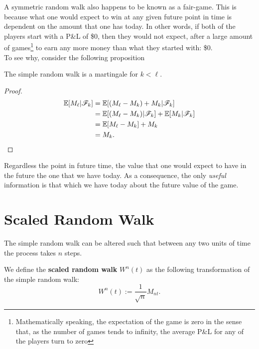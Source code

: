 \documentclass[../TGMAFFIRO]{subfiles}
\begin{document}
A symmetric random walk also happens to be known as a fair-game. This is because what one would expect to win at any given future point in time is dependent on the amount that one has today. In other words, if both of the players start with a P\&L of \$0, then they would not expect, after a large amount of games\footnote{Mathematically speaking, the expectation of the game is zero in the sense that, as the number of games tends to infinity, the average P\&L for any of the players turn to zero} to earn any more money than what they started with: \$0.\\

To see why, consider the following proposition

\begin{proposition}
	The simple random walk is a martingale for $k < \ell$.
\end{proposition}

\begin{proof}
	\begin{align*}
				\mathbb{E}[M_\ell|\mathscr{F}_k] &= \mathbb{E}[(M_\ell - M_k) + M_k | \mathscr{F}_k] \\
				&= \mathbb{E}[(M_\ell - M_k) | \mathscr{F}_k] + \mathbb{E}[M_k | \mathscr{F}_k] \\
				&= \mathbb{E}[M_\ell - M_k] + M_k\\
				&= M_k.
	\end{align*}
\end{proof}

Regardless the point in future time, the value that one would expect to have in the future the one that we have today. As a consequence, the only \textit{useful} information is that which we have today about the future value of the game.

\section{Scaled Random Walk}
The simple random walk can be altered such that between any two units of time the process takes $n$ steps.

\begin{definition}
	We define the \textbf{scaled random walk} $W^n(t)$ as the following transformation of the simple random walk:
	\[W^n(t) := \frac{1}{\sqrt{n}}M_{nt}.\]
\end{definition}
\end{document}
